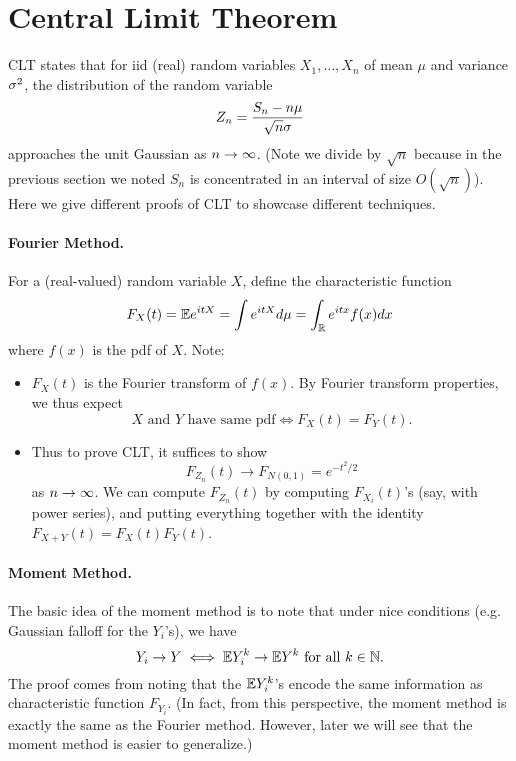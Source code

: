\section{Central Limit Theorem}

CLT states that for iid (real) random variables $X_1, \dots, X_n$ of mean $\mu$ and variance $\sigma^2$, the distribution of the random variable
\[
    Z_n = \frac{S_n - n\mu}{\sqrt{n}\sigma}
\]
approaches the unit Gaussian as $n \to \infty$. (Note we divide by $\sqrt{n}$ because in the previous section we noted $S_n$ is concentrated in an interval of size $O(\sqrt{n})$). Here we give different proofs of CLT to showcase different techniques.

\paragraph{Fourier Method.} For a (real-valued) random variable $X$, define the characteristic function
\[
    F_X(t) = {\mathbb E} e^{itX} = \int e^{itX} d\mu = \int_{\mathbb R} e^{itx} f(x) dx
\]
where $f(x)$ is the pdf of $X$. Note:
\begin{itemize}
    \item $F_X(t)$ is the Fourier transform of $f(x)$. By Fourier transform properties, we thus expect
    \[
        \text{$X$ and $Y$ have same pdf} \iff F_X(t) = F_Y(t).
    \]
    \item Thus to prove CLT, it suffices to show
    \[
        F_{Z_n}(t) \to F_{N(0,1)} = e^{-t^2/2}
    \]
    as $n \to \infty$. We can compute $F_{Z_n}(t)$ by computing $F_{X_i}(t)$'s (say, with power series), and putting everything together with the identity $F_{X+Y}(t) = F_{X}(t)F_{Y}(t)$.
\end{itemize}

\paragraph{Moment Method.} The basic idea of the moment method is to note that under nice conditions (e.g. Gaussian falloff for the $Y_i$'s), we have
\[
    Y_i \to Y \iff {\mathbb E} Y_i^k \to {\mathbb E} Y^k \text{ for all } k \in {\mathbb N}.
\]
The proof comes from noting that the ${\mathbb E} Y_i^k$'s encode the same information as characteristic function $F_{Y_i}$. (In fact, from this perspective, the moment method is exactly the same as the Fourier method. However, later we will see that the moment method is easier to generalize.)

